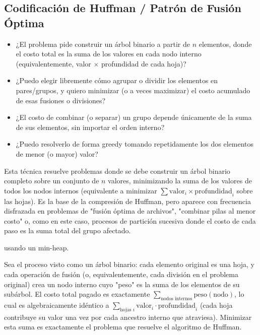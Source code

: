 \subsection{Codificación de Huffman / Patrón de Fusión Óptima}


\begin{itemize}
\item ¿El problema pide construir un árbol binario a partir de $n$ elementos, donde el costo total es la suma de los valores en cada nodo interno (equivalentemente, valor $\times$ profundidad de cada hoja)?
\item ¿Puedo elegir libremente cómo agrupar o dividir los elementos en pares/grupos, y quiero minimizar (o a veces maximizar) el costo acumulado de esas fusiones o divisiones?
\item ¿El costo de combinar (o separar) un grupo depende únicamente de la suma de sus elementos, sin importar el orden interno?
\item ¿Puedo resolverlo de forma greedy tomando repetidamente los dos elementos de menor (o mayor) valor?
\end{itemize}

 Esta técnica resuelve problemas donde se debe construir un árbol binario completo sobre un conjunto de $n$ valores, minimizando la suma de los valores de todos los nodos internos (equivalente a minimizar $\sum \text{valor}_i \times \text{profundidad}_i$ sobre las hojas). Es la base de la compresión de Huffman, pero aparece con frecuencia disfrazada en problemas de "fusión óptima de archivos", "combinar pilas al menor costo" o, como en este caso, procesos de partición sucesiva donde el costo de cada paso es la suma total del grupo afectado.

  usando un min-heap.

 Sea el proceso visto como un árbol binario: cada elemento original es una hoja, y cada operación de fusión (o, equivalentemente, cada división en el problema original) crea un nodo interno cuyo "peso" es la suma de los elementos de su subárbol. El costo total pagado es exactamente $\sum_{\text{nodos internos}} \text{peso}(\text{nodo})$, lo cual es algebraicamente idéntico a $\sum_{\text{hojas } i} \text{valor}_i \cdot \text{profundidad}_i$ (cada hoja contribuye su valor una vez por cada ancestro interno que atraviesa). Minimizar esta suma es exactamente el problema que resuelve el algoritmo de Huffman.

